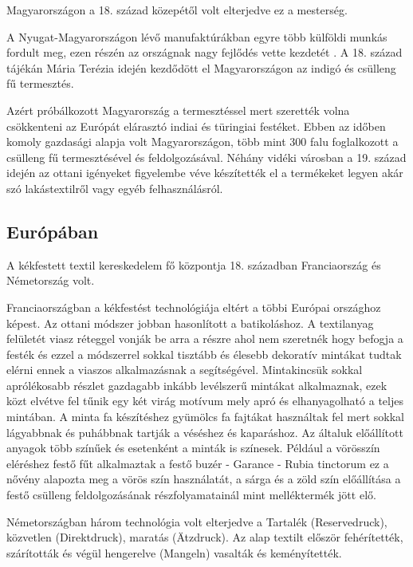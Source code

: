 \documentclass[fontsize=12pt, appendixprefix=true]{scrreprt}
\begin{document}
Magyarországon a 18. század közepétől volt elterjedve ez a mesterség.

A Nyugat-Magyarországon lévő manufaktúrákban egyre több külföldi munkás fordult meg, ezen részén az országnak nagy fejlődés vette kezdetét .
A 18. század tájékán Mária Terézia idején kezdődött el Magyarországon az indigó és csülleng fű termesztés.

Azért próbálkozott Magyarország a termesztéssel mert szerették volna csökkenteni az Európát elárasztó indiai és türingiai festéket.
Ebben az időben komoly gazdasági alapja volt Magyarországon, több mint 300 falu foglalkozott a csülleng fű termesztésével  és feldolgozásával.
Néhány vidéki városban a 19. század idején az ottani igényeket figyelembe véve készítették el a termékeket legyen akár szó lakástextilről vagy egyéb felhasználásról.
   

\subsection{Európában}
A kékfestett textil kereskedelem fő központja 18. században Franciaország  és Németország volt.

\vspace*{3 mm}
Franciaországban a kékfestést technológiája eltért a többi Európai országhoz képest. Az ottani módszer jobban hasonlított a batikoláshoz. A textilanyag felületét viasz réteggel vonják be arra a részre ahol nem szeretnék hogy befogja a festék és ezzel a módszerrel sokkal tisztább és élesebb dekoratív mintákat tudtak elérni ennek a viaszos alkalmazásnak a segítségével.
Mintakincsük sokkal aprólékosabb részlet gazdagabb inkább levélszerű mintákat alkalmaznak, ezek közt elvétve fel tűnik egy két virág motívum mely apró és elhanyagolható a teljes mintában.
A minta fa készítéshez gyümölcs fa fajtákat használtak fel mert sokkal lágyabbnak és puhábbnak tartják a véséshez és kaparáshoz. Az általuk előállított anyagok több színűek és esetenként a minták is színesek.
Például a vörösszín eléréshez festő fűt alkalmaztak a festő buzér - Garance - Rubia tinctorum  ez a nővény alapozta meg a vörös szín használatát, 
a sárga és a zöld szín előállítása a festő csülleng feldolgozásának részfolyamatainál mint melléktermék jött elő.

\vspace*{3 mm}
Németországban három technológia volt elterjedve a Tartalék (Reservedruck), közvetlen (Direktdruck), maratás (Ätzdruck). Az alap textilt először fehérítették, szárították és végül hengerelve (Mangeln) vasalták és keményítették.
\end{document}
